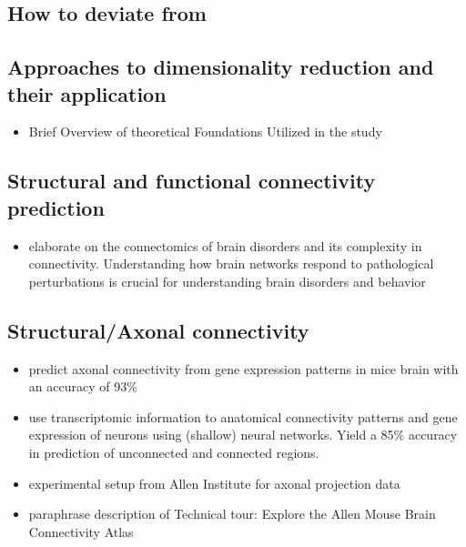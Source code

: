 \documentclass[]{article}
\renewcommand{\cite}{\citep}
\begin{document}
\subsection*{How to deviate from \cite{Partel2020}}

\subsection{Approaches to dimensionality reduction and their application}
\begin{itemize}
	\item Brief Overview of theoretical Foundations Utilized in the study
\end{itemize}

\subsection{Structural and functional connectivity prediction}

\begin{itemize}
	\item \cite{fornito2015connectomics} elaborate on the connectomics of brain disorders and its complexity in connectivity. Understanding how brain networks respond to pathological perturbations is crucial for understanding brain disorders and behavior
\end{itemize}
\subsection*{Structural/Axonal connectivity}

\begin{itemize}
	\item \cite{fakhry2015high} predict axonal connectivity from gene expression patterns in mice brain with an accuracy of 93\%
	\item \cite{roberti2019exploiting} use transcriptomic information to anatomical connectivity patterns and gene expression of neurons using (shallow) neural networks. Yield a 85\% accuracy in prediction of unconnected and connected regions.
	
\end{itemize}

\begin{itemize}
	\item experimental setup from Allen Institute for axonal projection data
	\item paraphrase description of \glqq Technical tour: Explore the Allen Mouse Brain Connectivity Atlas\grqq{}
\end{itemize}
\end{document}
